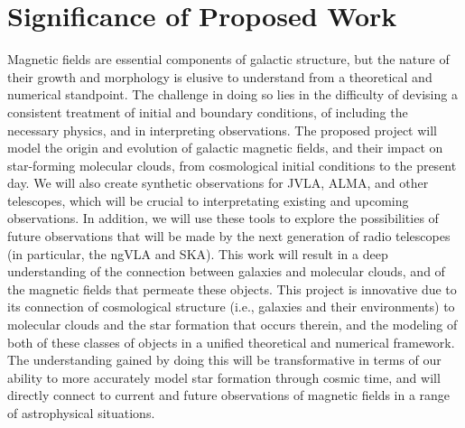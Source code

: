 \vspace{-4mm}
\section{Significance of Proposed Work}
\vspace{-3mm}

Magnetic fields are essential components of galactic structure, but
the nature of their growth and morphology is elusive to understand
from a theoretical and numerical standpoint.  The challenge in doing
so lies in the difficulty of devising a consistent treatment of
initial and boundary conditions, of including the necessary physics,
and in interpreting observations.  The proposed project will model the
origin and evolution of galactic magnetic fields, and their impact on
star-forming molecular clouds, from cosmological initial conditions to
the present day.  We will also create synthetic observations for JVLA,
ALMA, and other telescopes, which will be crucial to interpretating
existing and upcoming observations.  In addition, we will use these
tools to explore the possibilities of future observations that will be
made by the next generation of radio telescopes  (in particular, the ngVLA and SKA).  This work will
result in a deep understanding of the connection between galaxies and
molecular clouds, and of the magnetic fields that permeate these
objects.  This project is innovative due to its connection of
cosmological structure (i.e., galaxies and their environments) to
molecular clouds and the star formation that occurs therein, and the
modeling of both of these classes of objects in a unified theoretical
and numerical framework.  The understanding gained by doing this will
be transformative in terms of our ability to more accurately model
star formation through cosmic time, and will directly connect to
current and future observations of magnetic fields in a range of
astrophysical situations.
